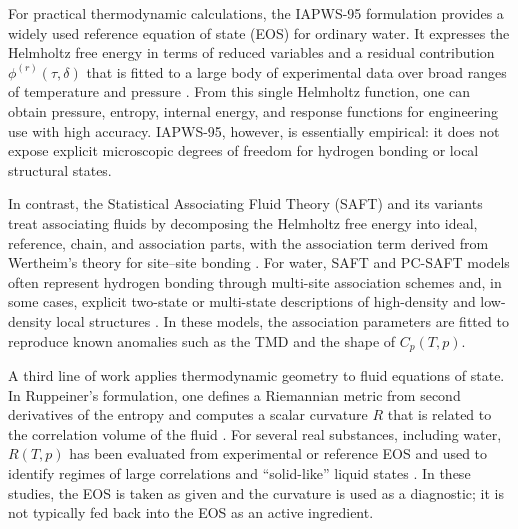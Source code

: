 \documentclass[12pt]{article}
\begin{document}
For practical thermodynamic calculations, the IAPWS-95 formulation provides a widely used reference equation of state (EOS) for ordinary water. It expresses the Helmholtz free energy in terms of reduced variables and a residual contribution $\phi^{(r)}(\tau,\delta)$ that is fitted to a large body of experimental data over broad ranges of temperature and pressure \cite{WagnerPruss2002,IAPWS95}. From this single Helmholtz function, one can obtain pressure, entropy, internal energy, and response functions for engineering use with high accuracy. IAPWS-95, however, is essentially empirical: it does not expose explicit microscopic degrees of freedom for hydrogen bonding or local structural states.

In contrast, the Statistical Associating Fluid Theory (SAFT) and its variants treat associating fluids by decomposing the Helmholtz free energy into ideal, reference, chain, and association parts, with the association term derived from Wertheim's theory for site--site bonding \cite{Chapman1989,Chapman1988}. For water, SAFT and PC-SAFT models often represent hydrogen bonding through multi-site association schemes and, in some cases, explicit two-state or multi-state descriptions of high-density and low-density local structures \cite{Novak2024,Novak2025,Marshall2021}. In these models, the association parameters are fitted to reproduce known anomalies such as the TMD and the shape of $C_p(T,p)$.

A third line of work applies thermodynamic geometry to fluid equations of state. In Ruppeiner's formulation, one defines a Riemannian metric from second derivatives of the entropy and computes a scalar curvature $R$ that is related to the correlation volume of the fluid \cite{Ruppeiner1995,Ruppeiner2013}. For several real substances, including water, $R(T,p)$ has been evaluated from experimental or reference EOS and used to identify regimes of large correlations and ``solid-like'' liquid states \cite{Ruppeiner2012,MayMausbach2015}. In these studies, the EOS is taken as given and the curvature is used as a diagnostic; it is not typically fed back into the EOS as an active ingredient.
\end{document}

